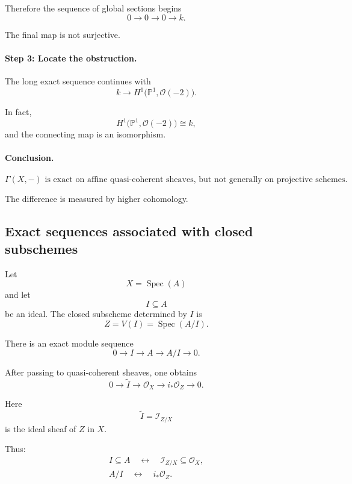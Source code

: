 \documentclass[12pt,a4paper]{article}
\theoremstyle{notespace}
\begin{document}
Therefore the sequence of global sections begins
\[
0
\longrightarrow
0
\longrightarrow
0
\longrightarrow
k.
\]

The final map is not surjective.

\paragraph{Step 3: Locate the obstruction.}

The long exact sequence continues with
\[
k
\longrightarrow
H^{1}\bigl(\mathbb{P}^{1},\mathcal{O}(-2)\bigr).
\]

In fact,
\[
H^{1}\bigl(\mathbb{P}^{1},\mathcal{O}(-2)\bigr)
\cong
k,
\]
and the connecting map is an isomorphism.

\paragraph{Conclusion.}

\[
\boxed{
	\Gamma(X,-)
	\text{ is exact on affine quasi-coherent sheaves, but not generally on projective schemes.}
}
\]

The difference is measured by higher cohomology.

\subsection{Exact sequences associated with closed subschemes}

Let
\[
X=\operatorname{Spec}(A)
\]
and let
\[
I\subseteq A
\]
be an ideal. The closed subscheme determined by \(I\) is
\[
Z=V(I)=\operatorname{Spec}(A/I).
\]

There is an exact module sequence
\[
0
\longrightarrow
I
\longrightarrow
A
\longrightarrow
A/I
\longrightarrow
0.
\]

After passing to quasi-coherent sheaves, one obtains
\[
0
\longrightarrow
\widetilde{I}
\longrightarrow
\mathcal{O}_{X}
\longrightarrow
i_{*}\mathcal{O}_{Z}
\longrightarrow
0.
\]

Here
\[
\widetilde{I}
=
\mathcal{I}_{Z/X}
\]
is the ideal sheaf of \(Z\) in \(X\).

Thus:
\[
\boxed{
	\begin{array}{c}
		I\subseteq A
		\quad\longleftrightarrow\quad
		\mathcal{I}_{Z/X}\subseteq\mathcal{O}_{X},
		\\[5pt]
		A/I
		\quad\longleftrightarrow\quad
		i_{*}\mathcal{O}_{Z}.
	\end{array}
}
\]
\end{document}
